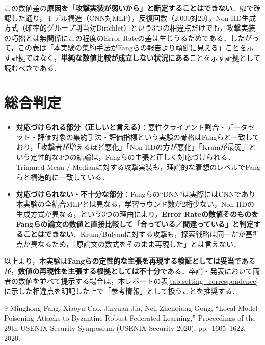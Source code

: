 \documentclass[a4j, twocolumn, dvipdfmx]{jsarticle}
\begin{document}
この数値差の\textbf{原因を「攻撃実装が弱いから」と断定することはできない}．\S 2で確認した通り，モデル構造（CNN対MLP），反復回数（2,000対20），Non-IID生成方式（確率的グループ割当対Dirichlet）という3つの相違点だけでも，攻撃実装の巧拙とは無関係にこの程度のError Rateの差は生じうるためである．したがって，この表は「本実験の集約手法がFangらの報告より頑健に見える」ことを示す証拠ではなく，\textbf{単純な数値比較が成立しない状況にある}ことを示す証拠として読むべきである．

\section{総合判定}

\begin{itemize}
  \item \textbf{対応づけられる部分（正しいと言える）}：悪性クライアント割合・データセット・評価対象の集約手法・評価指標という実験の骨格はFangらと一致しており，「攻撃者が増えるほど悪化」「Non-IIDの方が悪化」「Krumが最弱」という定性的な3つの結論は，Fangらの主張と正しく対応づけられる．Trimmed Mean / Medianに対する攻撃実装も，理論的な着想のレベルでFangらと構造的に一致している．
  \item \textbf{対応づけられない・不十分な部分}：Fangらの``DNN''は実際にはCNNであり本実験の全結合MLPとは異なる，学習ラウンド数が2桁少ない，Non-IIDの生成方式が異なる，という3つの理由により，\textbf{Error Rateの数値そのものをFangらの論文の数値と直接比較して「合っている／間違っている」と判定することはできない}．Krum/Bulyanに対する攻撃も，探索戦略は同一だが基準点が異なるため，「原論文の数式をそのまま再現した」とは言えない．
\end{itemize}

以上より，本実験は\textbf{Fangらの定性的な主張を再現する検証としては妥当}であるが，\textbf{数値の再現性を主張する根拠としては不十分}である．卒論・発表において両者の数値を並べて提示する場合は，本レポートの表\ref{tab:setting_correspondence}に示した相違点を明記した上で「参考情報」として扱うことを推奨する．

\begin{thebibliography}{9}
Minghong Fang, Xiaoyu Cao, Jinyuan Jia, Neil Zhenqiang Gong,
``Local Model Poisoning Attacks to Byzantine-Robust Federated Learning,''
Proceedings of the 29th USENIX Security Symposium (USENIX Security 2020),
pp.~1605--1622, 2020.
\end{thebibliography}
\end{document}
